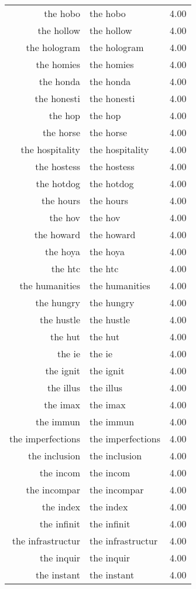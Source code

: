 \begin{table}[ht]
\begin{tabular}{rlr}
  the hobo & the hobo & 4.00 \\ 
  the hollow & the hollow & 4.00 \\ 
  the hologram & the hologram & 4.00 \\ 
  the homies & the homies & 4.00 \\ 
  the honda & the honda & 4.00 \\ 
  the honesti & the honesti & 4.00 \\ 
  the hop & the hop & 4.00 \\ 
  the horse & the horse & 4.00 \\ 
  the hospitality & the hospitality & 4.00 \\ 
  the hostess & the hostess & 4.00 \\ 
  the hotdog & the hotdog & 4.00 \\ 
  the hours & the hours & 4.00 \\ 
  the hov & the hov & 4.00 \\ 
  the howard & the howard & 4.00 \\ 
  the hoya & the hoya & 4.00 \\ 
  the htc & the htc & 4.00 \\ 
  the humanities & the humanities & 4.00 \\ 
  the hungry & the hungry & 4.00 \\ 
  the hustle & the hustle & 4.00 \\ 
  the hut & the hut & 4.00 \\ 
  the ie & the ie & 4.00 \\ 
  the ignit & the ignit & 4.00 \\ 
  the illus & the illus & 4.00 \\ 
  the imax & the imax & 4.00 \\ 
  the immun & the immun & 4.00 \\ 
  the imperfections & the imperfections & 4.00 \\ 
  the inclusion & the inclusion & 4.00 \\ 
  the incom & the incom & 4.00 \\ 
  the incompar & the incompar & 4.00 \\ 
  the index & the index & 4.00 \\ 
  the infinit & the infinit & 4.00 \\ 
  the infrastructur & the infrastructur & 4.00 \\ 
  the inquir & the inquir & 4.00 \\ 
  the instant & the instant & 4.00 \\ 

\end{tabular}
\end{table}
